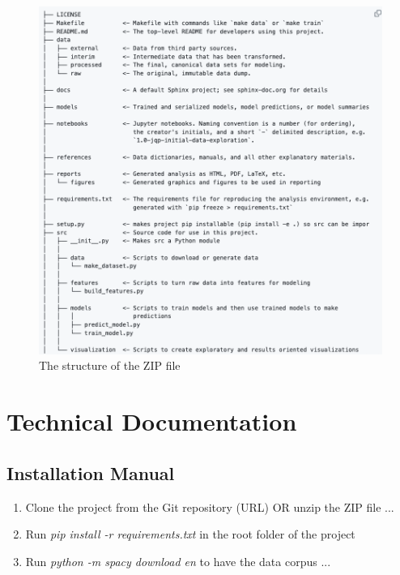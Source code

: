 \begin{figure}[h]
    \begin{centering}
    \includegraphics[width=\textwidth]{appendices/zip-file-structure.png}
    \par\end{centering}
\caption{The structure of the ZIP file \label{fig:zip-file-structure}}
\end{figure}



\chapter{Technical Documentation}
\label{chapter:Technical-Documentation}

\section{Installation Manual}
\label{sec:Installation-Manual}

\begin{enumerate}
    \item Clone the project from the Git repository (URL) OR unzip the ZIP file ...
    \item Run \emph{pip install -r requirements.txt} in the root folder of the project
    \item Run \emph{python -m spacy download en} to have the data corpus ...
\end{enumerate}



